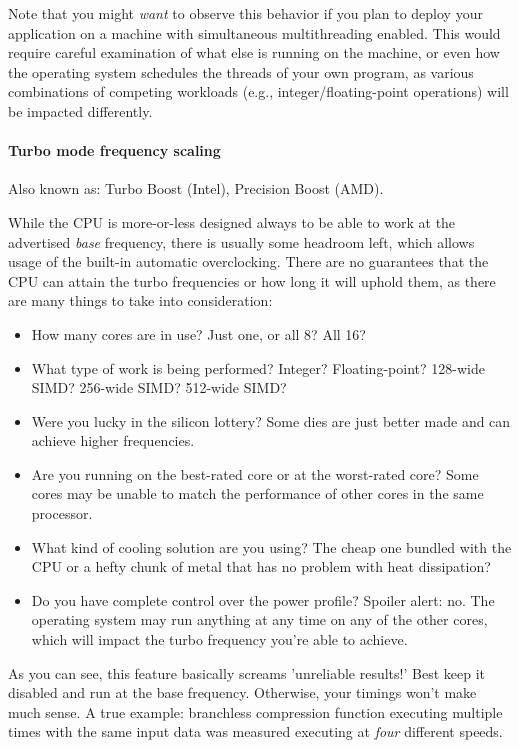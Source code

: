 \documentclass[hidelinks,titlepage,a4paper]{article}
\begin{document}
Note that you might \emph{want} to observe this behavior if you plan to deploy your application on a machine with simultaneous multithreading enabled. This would require careful examination of what else is running on the machine, or even how the operating system schedules the threads of your own program, as various combinations of competing workloads (e.g., integer/floating-point operations) will be impacted differently.

\paragraph{Turbo mode frequency scaling}

Also known as: Turbo Boost (Intel), Precision Boost (AMD).

While the CPU is more-or-less designed always to be able to work at the advertised \emph{base} frequency, there is usually some headroom left, which allows usage of the built-in automatic overclocking. There are no guarantees that the CPU can attain the turbo frequencies or how long it will uphold them, as there are many things to take into consideration:

\begin{itemize}
\item How many cores are in use? Just one, or all 8? All 16?
\item What type of work is being performed? Integer? Floating-point? 128-wide SIMD? 256-wide SIMD? 512-wide SIMD?
\item Were you lucky in the silicon lottery? Some dies are just better made and can achieve higher frequencies.
\item Are you running on the best-rated core or at the worst-rated core? Some cores may be unable to match the performance of other cores in the same processor.
\item What kind of cooling solution are you using? The cheap one bundled with the CPU or a hefty chunk of metal that has no problem with heat dissipation?
\item Do you have complete control over the power profile? Spoiler alert: no. The operating system may run anything at any time on any of the other cores, which will impact the turbo frequency you're able to achieve.
\end{itemize}

As you can see, this feature basically screams 'unreliable results!' Best keep it disabled and run at the base frequency. Otherwise, your timings won't make much sense. A true example: branchless compression function executing multiple times with the same input data was measured executing at \emph{four} different speeds.
\end{document}
